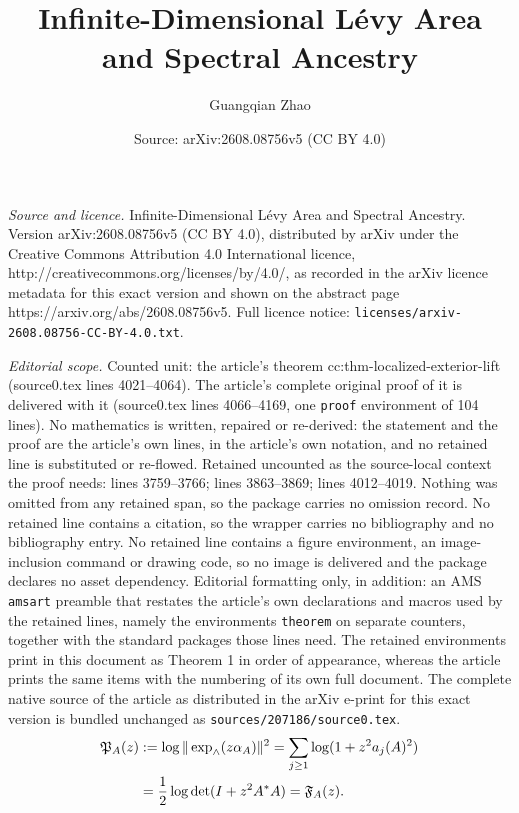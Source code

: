 \documentclass[10pt,a4paper]{amsart}
\title{Infinite-Dimensional L\'evy Area and Spectral Ancestry}
\author{Guangqian Zhao}
\date{Source: arXiv:2608.08756v5 (CC BY 4.0)}
\begin{document}
\maketitle

\noindent\emph{Source and licence.} Infinite-Dimensional L\'evy Area and Spectral Ancestry. Version arXiv:2608.08756v5 (CC BY 4.0), distributed by arXiv under the Creative Commons Attribution 4.0 International licence, http://creativecommons.org/licenses/by/4.0/, as recorded in the arXiv licence metadata for this exact version and shown on the abstract page https://arxiv.org/abs/2608.08756v5. Full licence notice: \texttt{licenses/arxiv-2608.08756-CC-BY-4.0.txt}.\par\smallskip

\noindent\textit{Editorial scope.} Counted unit: the article's theorem cc:thm-localized-exterior-lift (source0.tex lines 4021--4064). The article's complete original proof of it is delivered with it (source0.tex lines 4066--4169, one \texttt{proof} environment of 104 lines). No mathematics is written, repaired or re-derived: the statement and the proof are the article's own lines, in the article's own notation, and no retained line is substituted or re-flowed.  Retained uncounted as the source-local context the proof needs: lines 3759--3766; lines 3863--3869; lines 4012--4019.  Nothing was omitted from any retained span, so the package carries no omission record.  No retained line contains a citation, so the wrapper carries no bibliography and no bibliography entry.  No retained line contains a figure environment, an image-inclusion command or drawing code, so no image is delivered and the package declares no asset dependency.  Editorial formatting only, in addition: an AMS \texttt{amsart} preamble that restates the article's own declarations and macros used by the retained lines, namely the environments \texttt{theorem} on separate counters, together with the standard packages those lines need.  The retained environments print in this document as Theorem 1 in order of appearance, whereas the article prints the same items with the numbering of its own full document.  The complete native source of the article as distributed in the arXiv e-print for this exact version is bundled unchanged as \texttt{sources/207186/source0.tex}.
\begin{align}
 \mathfrak P_A(z)
 &:=\log\|\exp_{\wedge}(z\alpha_A)\|^2
   =\sum_{j\geq1}\log(1+z^2a_j(A)^2) \notag\\
 &=\frac12\log\det(I+z^2A^*A)
   =\mathfrak F_A(z).
 \label{cc:eq-exterior-profile}
\end{align}
\end{document}
